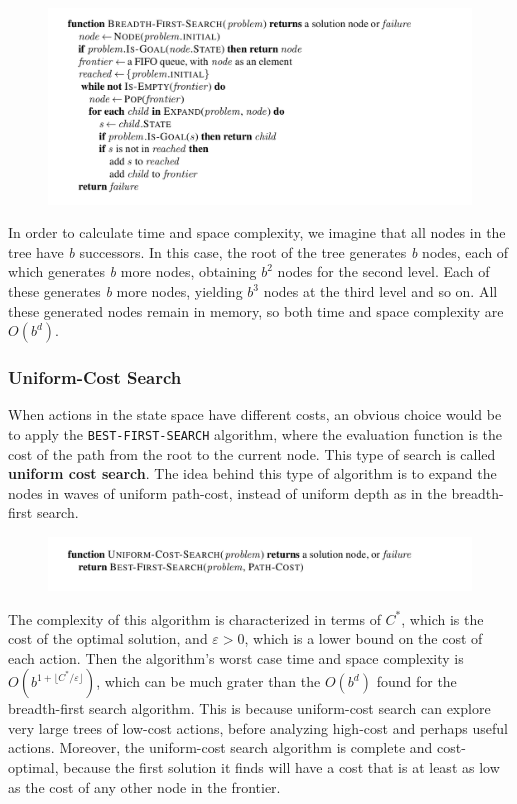 \documentclass{article}
\newcommand{\code}{\lstinline}
\begin{document}
\clearpage
\begin{figure}[h]
    \centering
    \includegraphics[width=1\linewidth]{algorithms/Breadth First Search.png}
    \label{fig:breadth_first_search_algorithm}
\end{figure}

In order to calculate time and space complexity, we imagine that all nodes in the tree have \textit{b} successors. In this case, the root of the tree generates \textit{b} nodes, each of which generates \textit{b} more nodes, obtaining $b^2$ nodes for the second level. Each of these generates \textit{b} more nodes, yielding $b^3$ nodes at the third level and so on. All these generated nodes remain in memory, so both time and space complexity are $O(b^d)$.

\subsubsection{Uniform-Cost Search}
When actions in the state space have different costs, an obvious choice would be to apply the \code{BEST-FIRST-SEARCH} algorithm, where the evaluation function is the cost of the path from the root to the current node. This type of search is called \textbf{uniform cost search}. The idea behind this type of algorithm is to expand the nodes in waves of uniform path-cost, instead of uniform depth as in the breadth-first search.

\begin{figure}[h]
    \centering
    \includegraphics[width=\linewidth]{algorithms/Cost Uniform Search.png}
    \label{fig:uniform_cost_search_algorithm}
\end{figure}

The complexity of this algorithm is characterized in terms of $C^*$, which is the cost of the optimal solution, and $\varepsilon > 0$, which is a lower bound on the cost of each action. Then the algorithm's worst case time and space complexity is $O(b^{1+\lfloor C^*/\varepsilon \rfloor})$, which can be much grater than the $O(b^d)$ found for the breadth-first search algorithm. This is because uniform-cost search can explore very large trees of low-cost actions, before analyzing high-cost and perhaps useful actions. Moreover, the uniform-cost search algorithm is complete and cost-optimal, because the first solution it finds will have a cost that is at least as low as the cost of any other node in the frontier.
\end{document}
